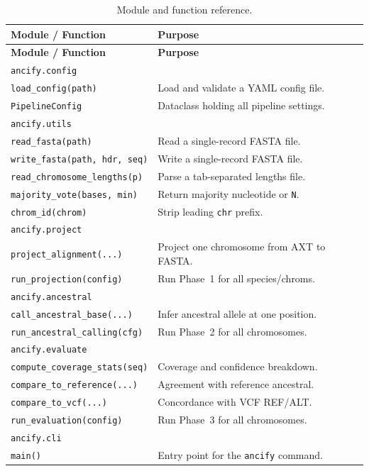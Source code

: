 \documentclass[11pt,a4paper]{article}
\begin{document}
\begin{longtable}{p{4.5cm}p{9cm}}
\caption{Module and function reference.} \\
\toprule
\textbf{Module / Function} & \textbf{Purpose} \\
\midrule
\endfirsthead
\toprule
\textbf{Module / Function} & \textbf{Purpose} \\
\midrule
\endhead
\bottomrule
\endfoot
\texttt{ancify.config} & \\
\quad\texttt{load\_config(path)} & Load and validate a YAML config file. \\
\quad\texttt{PipelineConfig} & Dataclass holding all pipeline settings. \\
\midrule
\texttt{ancify.utils} & \\
\quad\texttt{read\_fasta(path)} & Read a single-record FASTA file. \\
\quad\texttt{write\_fasta(path, hdr, seq)} & Write a single-record FASTA file. \\
\quad\texttt{read\_chromosome\_lengths(p)} & Parse a tab-separated lengths file. \\
\quad\texttt{majority\_vote(bases, min)} & Return majority nucleotide or \texttt{N}. \\
\quad\texttt{chrom\_id(chrom)} & Strip leading \texttt{chr} prefix. \\
\midrule
\texttt{ancify.project} & \\
\quad\texttt{project\_alignment(...)} & Project one chromosome from AXT to FASTA. \\
\quad\texttt{run\_projection(config)} & Run Phase~1 for all species/chroms. \\
\midrule
\texttt{ancify.ancestral} & \\
\quad\texttt{call\_ancestral\_base(...)} & Infer ancestral allele at one position. \\
\quad\texttt{run\_ancestral\_calling(cfg)} & Run Phase~2 for all chromosomes. \\
\midrule
\texttt{ancify.evaluate} & \\
\quad\texttt{compute\_coverage\_stats(seq)} & Coverage and confidence breakdown. \\
\quad\texttt{compare\_to\_reference(...)} & Agreement with reference ancestral. \\
\quad\texttt{compare\_to\_vcf(...)} & Concordance with VCF REF/ALT. \\
\quad\texttt{run\_evaluation(config)} & Run Phase~3 for all chromosomes. \\
\midrule
\texttt{ancify.cli} & \\
\quad\texttt{main()} & Entry point for the \texttt{ancify} command. \\
\end{longtable}
\end{document}
